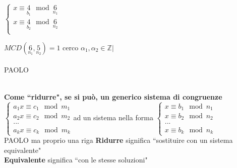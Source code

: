     $
    \begin{cases}
        x\equiv\underset{b_1}{4}\mod \underset{n_1}{6}\\
        x\equiv\underset{b_2}{4}\mod \underset{n_2}{6}\\
    \end{cases}
    $

    $MCD(\underset{n_1}{6},\underset{n_2}{5})=1$ cerco $\alpha_1,\alpha_2\in\mathbb{Z}|$
    {\color{purple} \\\\PAOLO\\\\}

    \textbf{Come ``ridurre", se si può, un generico sistema di congruenze}\\

    $
    \begin{cases}
        a_1x\equiv c_1\mod m_1\\
        a_2x\equiv c_2\mod m_2\\
        ...\\
        a_kx\equiv c_k\mod m_k
    \end{cases}
    $ad un sistema nella forma 
    $
    \begin{cases}
        x\equiv b_1\mod n_1\\
        x\equiv b_2\mod n_2\\
        ...\\
        x\equiv b_k\mod n_k
    \end{cases}
    $\\
    {\color{purple} PAOLO ma proprio una riga}
    \textbf{Ridurre} significa ``sostituire con un sistema equivalente"\\
    \textbf{Equivalente} significa ``con le stesse soluzioni" 
